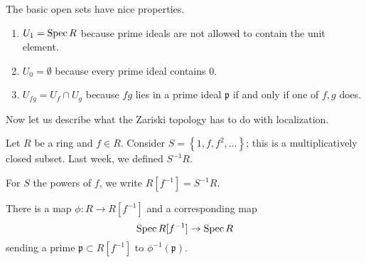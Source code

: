 The basic open sets have nice properties.
\begin{enumerate}
\item $U_1 = \operatorname{Spec} R$ because prime ideals are not allowed to
contain the
unit element. 
\item $U_0 = \emptyset$ because every prime ideal contains $0$.
\item $U_{fg} = U_f \cap U_g$ because $fg$ lies in a prime ideal
$\mathfrak{p}$ if and only if one of $f,g$ does.
\end{enumerate}

Now let us describe what the Zariski topology has to do with
localization.

\begin{example} 
Let $R$ be a ring and $f \in R$. Consider $S = \left\{1, f, f^2,
\dots
\right\}$; this is a multiplicatively closed subset. Last week,
we defined
$S^{-1}R$.
\end{example}

\begin{definition} 
For $S$ the powers of $f$, we write $R[f^{-1}]=S^{-1}R$. 
\end{definition} 

There is  a map $\phi: R \to R[f^{-1}]$ and a corresponding map
\[ \operatorname{Spec} R[f^{-1}] \to \operatorname{Spec} R  \]
sending a prime $\mathfrak{p} \subset R[f^{-1}]$ to
$\phi^{-1}(\mathfrak{p})$.

